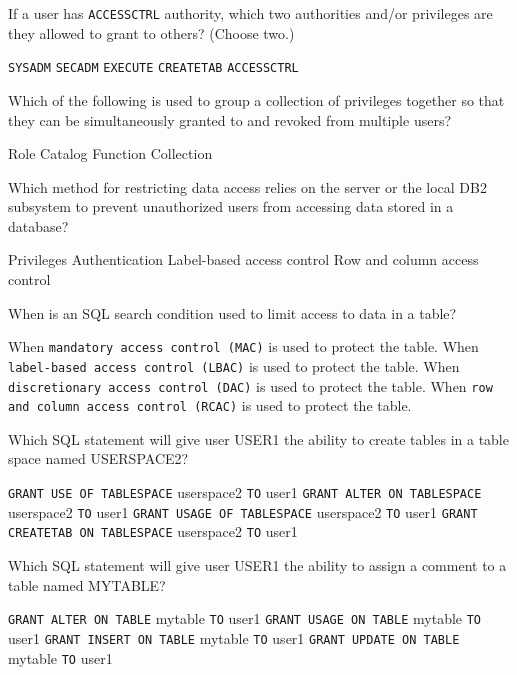 \documentclass[11pt]{exam}
\begin{document}
\begin{questions}
\question[1]
If a user has \texttt{ACCESSCTRL} authority, which two authorities and/or privileges are they allowed
to grant to others? (Choose two.)
\begin{choices}
\choice \texttt{SYSADM}
\choice \texttt{SECADM}
\choice \texttt{EXECUTE}
\choice \texttt{CREATETAB}
\choice \texttt{ACCESSCTRL}
\end{choices}

\newpage

\question[1]
Which of the following is used to group a collection of privileges together so that they can be
simultaneously granted to and revoked from multiple users?
\begin{choices}
\choice Role
\choice Catalog
\choice Function
\choice Collection
\end{choices}

\question[1]
Which method for restricting data access relies on the server or the local DB2 subsystem to prevent
unauthorized users from accessing data stored in a database?
\begin{choices}
\choice Privileges
\choice Authentication
\choice Label-based access control
\choice Row and column access control
\end{choices}

\question[1]
When is an SQL search condition used to limit access to data in a table?
\begin{choices}
\choice When \texttt{mandatory access control (MAC)} is used to protect the table.
\choice When \texttt{label-based access control (LBAC)} is used to protect the table.
\choice When \texttt{discretionary access control (DAC)} is used to protect the table.
\choice When \texttt{row and column access control (RCAC)} is used to protect the table.
\end{choices}

\question[1]
Which SQL statement will give user USER1 the ability to create tables in a table space named USERSPACE2?
\begin{choices}
\choice \texttt{GRANT USE OF TABLESPACE} userspace2 \texttt{TO} user1
\choice \texttt{GRANT ALTER ON TABLESPACE} userspace2 \texttt{TO} user1
\choice \texttt{GRANT USAGE OF TABLESPACE} userspace2 \texttt{TO} user1
\choice \texttt{GRANT CREATETAB ON TABLESPACE} userspace2 \texttt{TO} user1
\end{choices}

\question[1]
Which SQL statement will give user USER1 the ability to assign a comment to a table named MYTABLE?
\begin{choices}
\choice \texttt{GRANT ALTER ON TABLE} mytable \texttt{TO} user1
\choice \texttt{GRANT USAGE ON TABLE} mytable \texttt{TO} user1
\choice \texttt{GRANT INSERT ON TABLE} mytable \texttt{TO} user1
\choice \texttt{GRANT UPDATE ON TABLE} mytable \texttt{TO} user1
\end{choices}


\end{questions}
\end{document}
